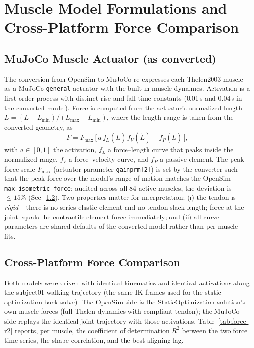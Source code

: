 \section{Muscle Model Formulations and Cross-Platform Force Comparison}
\label{sec:muscle-models}

\subsection{MuJoCo Muscle Actuator (as converted)}

The conversion from OpenSim to MuJoCo re-expresses each Thelen2003
muscle as a MuJoCo \texttt{general} actuator with the built-in muscle
dynamics. Activation is a first-order process with distinct rise and
fall time constants (0.01\,s and 0.04\,s in the converted model). Force
is computed from the actuator's normalized length
$\bar{L} = (L - L_{\min}) / (L_{\max} - L_{\min})$, where the length
range is taken from the converted geometry, as
\begin{equation}
  F = F_{\max}\,\bigl[\,a\, f_L(\bar{L})\, f_V(\dot{L}) - f_P(\bar{L})\,\bigr],
  \label{eq:mj-muscle}
\end{equation}
with $a \in [0,1]$ the activation, $f_L$ a force--length curve that
peaks inside the normalized range, $f_V$ a force--velocity curve, and
$f_P$ a passive element. The peak force scale $F_{\max}$ (actuator
parameter \texttt{gainprm[2]}) is set by the converter such that the
peak force over the model's range of motion matches the OpenSim
\texttt{max\_isometric\_force}; audited across all 84 active muscles,
the deviation is $\le 15\%$ (Sec.~\ref{sec:muscle-models-compare}). Two
properties matter for interpretation: (i) the tendon is \emph{rigid} --
there is no series-elastic element and no tendon slack length; force at
the joint equals the contractile-element force immediately; and (ii)
all curve parameters are shared defaults of the converted model rather
than per-muscle fits.

\subsection{Cross-Platform Force Comparison}
\label{sec:muscle-models-compare}

Both models were driven with identical kinematics and identical
activations along the subject01 walking trajectory (the same IK frames
used for the static-optimization back-solve). The OpenSim side is the
StaticOptimization solution's own muscle forces (full Thelen dynamics
with compliant tendon); the MuJoCo side replays the identical joint
trajectory with those activations. Table~\ref{tab:force-r2} reports, per
muscle, the coefficient of determination $R^2$ between the two force
time series, the shape correlation, and the best-aligning lag.

